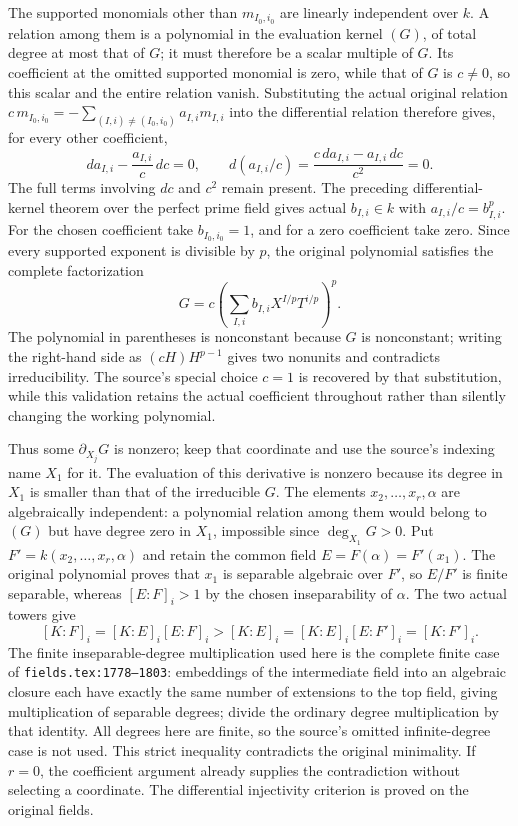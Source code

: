The supported monomials other than \(m_{I_0,i_0}\) are linearly independent over \(k\). A relation among them is a polynomial in the evaluation kernel \((G)\), of total degree at most that of \(G\); it must therefore be a scalar multiple of \(G\). Its coefficient at the omitted supported monomial is zero, while that of \(G\) is \(c\ne0\), so this scalar and the entire relation vanish. Substituting the actual original relation \(c\,m_{I_0,i_0}=-\sum_{(I,i)\ne(I_0,i_0)}a_{I,i}m_{I,i}\) into the differential relation therefore gives, for every other coefficient, \[
 da_{I,i}-\frac{a_{I,i}}c\,dc=0,
 \qquad
 d(a_{I,i}/c)=\frac{c\,da_{I,i}-a_{I,i}\,dc}{c^2}=0.
\] The full terms involving \(dc\) and \(c^2\) remain present. The preceding differential-kernel theorem over the perfect prime field gives actual \(b_{I,i}\in k\) with \(a_{I,i}/c=b_{I,i}^p\). For the chosen coefficient take \(b_{I_0,i_0}=1\), and for a zero coefficient take zero. Since every supported exponent is divisible by \(p\), the original polynomial satisfies the complete factorization \[
 G=c\left(\sum_{I,i} b_{I,i}X^{I/p}T^{i/p}\right)^p.
\] The polynomial in parentheses is nonconstant because \(G\) is nonconstant; writing the right-hand side as \((cH)H^{p-1}\) gives two nonunits and contradicts irreducibility. The source's special choice \(c=1\) is recovered by that substitution, while this validation retains the actual coefficient throughout rather than silently changing the working polynomial.

Thus some \(\partial_{X_j}G\) is nonzero; keep that coordinate and use the source's indexing name \(X_1\) for it. The evaluation of this derivative is nonzero because its degree in \(X_1\) is smaller than that of the irreducible \(G\). The elements \(x_2,\ldots,x_r,\alpha\) are algebraically independent: a polynomial relation among them would belong to \((G)\) but have degree zero in \(X_1\), impossible since \(\deg_{X_1}G>0\). Put \(F'=k(x_2,\ldots,x_r,\alpha)\) and retain the common field \(E=F(\alpha)=F'(x_1)\). The original polynomial proves that \(x_1\) is separable algebraic over \(F'\), so \(E/F'\) is finite separable, whereas \([E:F]_i>1\) by the chosen inseparability of \(\alpha\). The two actual towers give \[
 [K:F]_i=[K:E]_i[E:F]_i>[K:E]_i
        =[K:E]_i[E:F']_i=[K:F']_i.
\] The finite inseparable-degree multiplication used here is the complete finite case of \texttt{fields.tex:1778–1803}: embeddings of the intermediate field into an algebraic closure each have exactly the same number of extensions to the top field, giving multiplication of separable degrees; divide the ordinary degree multiplication by that identity. All degrees here are finite, so the source's omitted infinite-degree case is not used. This strict inequality contradicts the original minimality. If \(r=0\), the coefficient argument already supplies the contradiction without selecting a coordinate. The differential injectivity criterion is proved on the original fields.

